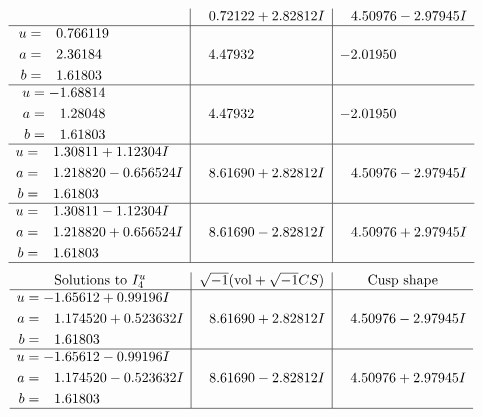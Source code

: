 \documentclass[1p]{elsarticle_modified}
\theoremstyle{definition}
\newcommand{\I}{\sqrt{-1}}
\begin{document}
$$\begin{array}{c|c|c}
 & \phantom{-}0.72122 + 2.82812 I & \phantom{-}4.50976 - 2.97945 I \\ \hline\begin{aligned}
u &= \phantom{-}0.766119\phantom{ +0.000000I} \\
a &= \phantom{-}2.36184\phantom{ +0.000000I} \\
b &= \phantom{-}1.61803\phantom{ +0.000000I}\end{aligned}
 & \phantom{-}4.47932\phantom{ +0.000000I} & -2.01950\phantom{ +0.000000I} \\ \hline\begin{aligned}
u &= -1.68814\phantom{ +0.000000I} \\
a &= \phantom{-}1.28048\phantom{ +0.000000I} \\
b &= \phantom{-}1.61803\phantom{ +0.000000I}\end{aligned}
 & \phantom{-}4.47932\phantom{ +0.000000I} & -2.01950\phantom{ +0.000000I} \\ \hline\begin{aligned}
u &= \phantom{-}1.30811 + 1.12304 I \\
a &= \phantom{-}1.218820 - 0.656524 I \\
b &= \phantom{-}1.61803\phantom{ +0.000000I}\end{aligned}
 & \phantom{-}8.61690 + 2.82812 I & \phantom{-}4.50976 - 2.97945 I \\ \hline\begin{aligned}
u &= \phantom{-}1.30811 - 1.12304 I \\
a &= \phantom{-}1.218820 + 0.656524 I \\
b &= \phantom{-}1.61803\phantom{ +0.000000I}\end{aligned}
 & \phantom{-}8.61690 - 2.82812 I & \phantom{-}4.50976 + 2.97945 I\\
 \hline 
 \end{array}$$\newpage$$\begin{array}{c|c|c}  
\text{Solutions to }I^u_{4}& \I (\text{vol} + \sqrt{-1}CS) & \text{Cusp shape}\\
 \hline 
\begin{aligned}
u &= -1.65612 + 0.99196 I \\
a &= \phantom{-}1.174520 + 0.523632 I \\
b &= \phantom{-}1.61803\phantom{ +0.000000I}\end{aligned}
 & \phantom{-}8.61690 + 2.82812 I & \phantom{-}4.50976 - 2.97945 I \\ \hline\begin{aligned}
u &= -1.65612 - 0.99196 I \\
a &= \phantom{-}1.174520 - 0.523632 I \\
b &= \phantom{-}1.61803\phantom{ +0.000000I}\end{aligned}
 & \phantom{-}8.61690 - 2.82812 I & \phantom{-}4.50976 + 2.97945 I\\
 \hline 
 \end{array}$$\newpage
\end{document}

